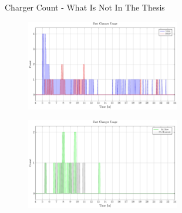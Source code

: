 \documentclass[bigger]{beamer}
\begin{document}
\begin{frame}[label={sec:org9591eee}]{Charger Count - What Is Not In The Thesis}
\begin{figure}[htpb]
\centering
    \includegraphics[width=0.6\textwidth]{img/sa-pap-paper-good/charger-count-fast-milp-qin}
\end{figure}
\begin{figure}[htpb]
\centering
    \includegraphics[width=0.6\textwidth]{img/sa-pap-paper-good/charger-count-fast-sa}
\end{figure}
\end{frame}
\end{document}
